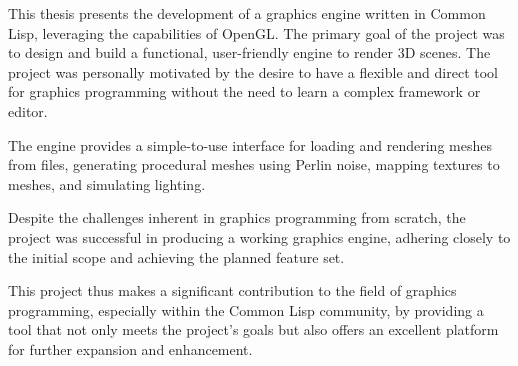 This thesis presents the development of a graphics engine written in Common Lisp,
leveraging the capabilities of OpenGL.
The primary goal of the project was to design and build a functional,
user-friendly engine to render 3D scenes.
The project was personally motivated by the desire to have a flexible and direct tool for graphics programming without the need to learn a complex framework or editor.

The engine provides a simple-to-use interface for loading and rendering meshes from files,
generating procedural meshes using Perlin noise,
mapping textures to meshes,
and simulating lighting.

Despite the challenges inherent in graphics programming from scratch,
the project was successful in producing a working graphics engine,
adhering closely to the initial scope and achieving the planned feature set.

This project thus makes a significant contribution to the field of graphics programming,
especially within the Common Lisp community,
by providing a tool that not only meets the project's goals but also offers an excellent platform for further expansion and enhancement.
